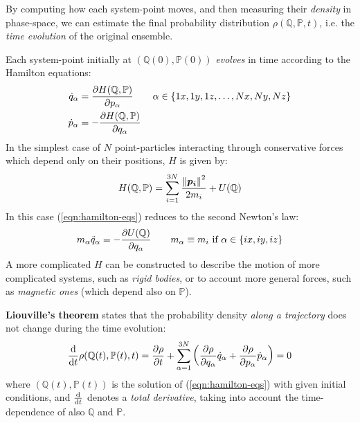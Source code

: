 \documentclass[../../main.tex]{subfiles}
\begin{document}
By computing how each system-point moves, and then measuring their \textit{density} in phase-space, we can estimate the final probability distribution $\rho(\mathbb{Q},\mathbb{P},t)$, i.e. the \textit{time evolution} of the original ensemble. 

\medskip

Each system-point initially at $(\mathbb{Q}(0), \mathbb{P}(0))$ \textit{evolves} in time according to the Hamilton equations:
\begin{align}\label{eqn:hamilton-eqs}
    \dot{q}_\alpha &= \pdv{H(\mathbb{Q},\mathbb{P})}{p_\alpha}\qquad \alpha \in \{1x, 1y, 1z,\dots, Nx, Ny, Nz\}\\
    \dot{p}_{\alpha} &= -\pdv{H(\mathbb{Q},\mathbb{P})}{q_\alpha}
\end{align} 
In the simplest case of $N$ point-particles interacting through conservative forces which depend only on their positions, $H$ is given by:
\begin{align*}
    H(\mathbb{Q},\mathbb{P}) = \sum_{i=1}^{3N} \frac{\norm{\bm{p_i}}^2}{2m_i} + U(\mathbb{Q}) 
\end{align*}
In this case (\ref{eqn:hamilton-eqs}) reduces to the second Newton's law:
\begin{align}\label{eqn:newton-eqs}
    m_\alpha \ddot{q}_\alpha = - \pdv{U(\mathbb{Q})}{q_\alpha} \qquad m_\alpha \equiv m_i \text{ if } \alpha \in \{ix,iy,iz\}
\end{align}
A more complicated $H$ can be constructed to describe the motion of more complicated systems, such as \textit{rigid bodies}, or to account more general forces, such as \textit{magnetic ones} (which depend also on $\mathbb{P}$).

\medskip

\textbf{Liouville's theorem} states that the probability density \textit{along a trajectory} does not change during the time evolution: 
\begin{align}\label{eqn:Liouville}
    \dv{t} \rho(\mathbb{Q}(t), \mathbb{P}(t),t) = \pdv{\rho}{t} + \sum_{\alpha=1}^{3N} \left(\pdv{\rho}{q_\alpha} \dot{q}_\alpha + \pdv{\rho}{p_\alpha} \dot{p}_\alpha\right) = 0
\end{align}
where $(\mathbb{Q}(t), \mathbb{P}(t))$ is the solution of (\ref{eqn:hamilton-eqs}) with given initial conditions, and $\dv{t}$ denotes a \textit{total derivative}, taking into account the time-dependence of also $\mathbb{Q}$ and $\mathbb{P}$.  
\end{document}
